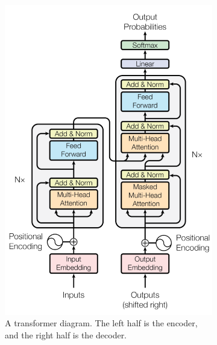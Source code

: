 \begin{figure}[H]
    \centering
    \begin{subfigure}[b]{0.4\textwidth}
        \includegraphics[width=\linewidth]{img/transformer.png}
        \caption{A transformer diagram. The left half is the encoder, and the right half is the decoder.}
        \label{fig:transformer_diagram}
    \end{subfigure}
        \begin{subfigure}[b]{0.5\textwidth}

\end{subfigure}
\end{figure}
